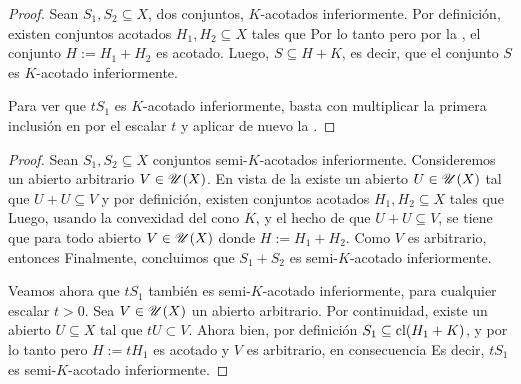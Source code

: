 \begin{proof}
Sean $S_1, S_2\subseteq X$, dos conjuntos, $K$-acotados 
inferiormente.
Por definición, existen conjuntos acotados 
$H_1,H_2\subseteq X$ tales que 
Por lo tanto
pero por la , el conjunto $H:=H_1+H_2$
es acotado. Luego, $S\subseteq H+K$, es decir, que 
el conjunto $S$ es $K$-acotado inferiormente.

Para ver que $tS_1$ es $K$-acotado inferiormente, basta
con multiplicar la primera inclusión en 
por el escalar $t$ y aplicar de nuevo la .
\end{proof}
\begin{proof}
Sean $S_1,S_2\subseteq X$ conjuntos semi-$K$-acotados
inferiormente. Consideremos un abierto arbitrario 
$V\in\mathscr{U}(X)$. En vista de la  existe un abierto 
$U\in\mathscr{U}(X)$ tal que $U+U\subseteq V$ y
por definición, existen conjuntos acotados 
$H_1,H_2\subseteq X$ tales que 
Luego, usando la convexidad del cono $K$, y el hecho de que
$U+U\subseteq V$, se tiene que para todo abierto $V\in\mathscr{U}(X)$
donde $H:=H_1+H_2$. Como $V$ es arbitrario, entonces
Finalmente, concluimos que $S_1+S_2$ es semi-$K$-acotado
inferiormente.

Veamos ahora que $tS_1$ también es semi-$K$-acotado
inferiormente, para cualquier escalar $t>0$. 
Sea $V\in\mathscr{U}(X)$ un abierto arbitrario. Por continuidad,
existe un abierto $U\subseteq X$ tal que $tU\subset V$.
Ahora bien, por definición $S_1\subseteq\mathop{\hbox{\rm cl}}\nolimits(H_1+K)$, y 
por lo tanto
pero $H:=tH_1$ es acotado y $V$ es arbitrario, 
en consecuencia
Es decir, $tS_1$ es semi-$K$-acotado inferiormente.
\end{proof}
